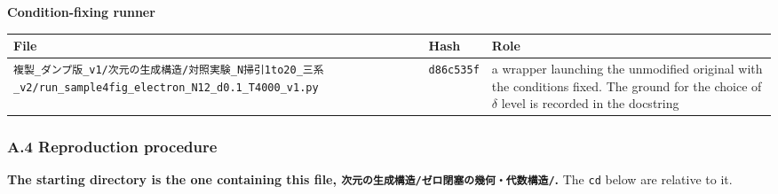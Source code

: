 \documentclass[
  10pt,
]{article}
\newcounter{none} %
\begin{document}
\textbf{Condition-fixing runner}

{\def\LTcaptype{none} %
\begin{longtable}[]{@{}
  >{\raggedright\arraybackslash}p{}
  >{\raggedright\arraybackslash}p{}
  >{\raggedright\arraybackslash}p{}@{}}
\toprule\noalign{}
\begin{minipage}[b]{\linewidth}\raggedright
File
\end{minipage} & \begin{minipage}[b]{\linewidth}\raggedright
Hash
\end{minipage} & \begin{minipage}[b]{\linewidth}\raggedright
Role
\end{minipage} \\
\midrule\noalign{}
\endhead
\bottomrule\noalign{}
\endlastfoot
\texttt{複製\_ダンプ版\_v1/次元の生成構造/対照実験\_N掃引1to20\_三系\_v2/run\_sample4fig\_electron\_N12\_d0.1\_T4000\_v1.py}
& \texttt{d86c535f} & a wrapper launching the unmodified original with
the conditions fixed. The ground for the choice of \(\delta\) level is
recorded in the docstring \\
\end{longtable}
}

\subsubsection{A.4 Reproduction
procedure}\label{a.4-reproduction-procedure}

\textbf{The starting directory is the one containing this file,
\texttt{次元の生成構造/ゼロ閉塞の幾何・代数構造/}.} The \texttt{cd}
below are relative to it.
\end{document}

